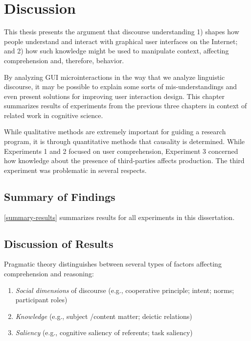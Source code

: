 \chapter{Discussion}
\label{discussion}

This thesis presents the argument that discourse understanding 1) shapes how people understand and interact with graphical user interfaces on the Internet; and 2) how such knowledge might be used to manipulate context, affecting comprehension and, therefore, behavior.

By analyzing GUI microinteractions in the way that we analyze linguistic discourse, it may be possible to explain some sorts of mis-understandings and even present solutions for improving user interaction design. This chapter summarizes results of experiments from the previous three chapters in context of related work in cognitive science.

While qualitative methods are extremely important for guiding a research program, it is through quantitative methods that causality is determined. While Experiments 1 and 2 focused on user comprehension, Experiment 3 concerned how knowledge about the presence of third-parties affects production. The third experiment was problematic in several respects.

\section{Summary of Findings}
\label{summaryoffindings}

 \autoref{summary-results}  summarizes results for all experiments in this dissertation.





\section{Discussion of Results}
\label{discussionofresults}

Pragmatic theory distinguishes between several types of factors affecting comprehension and reasoning:

\begin{enumerate}
\item \emph{Social dimensions} of discourse (e.g., cooperative principle; intent; norms; participant roles)

\item \emph{Knowledge} (e.g., subject \slash  content matter; deictic relations)

\item \emph{Saliency} (e.g., cognitive saliency of referents; task saliency)

\end{enumerate}

